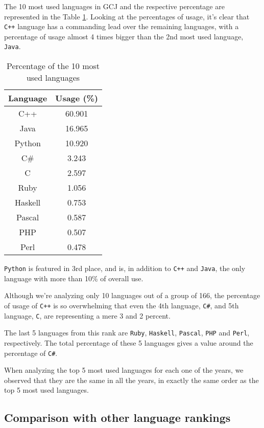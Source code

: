 \documentclass{article}
\begin{document}
\begin{multicols*}{2}
The 10 most used languages in GCJ and the respective percentage are represented in the Table \ref{lang_perc}.
Looking at the percentages of usage, it's clear that \texttt{C++} language has a commanding lead over the remaining languages, with a percentage of usage almost 4 times bigger than the 2nd most used language, \texttt{Java}.

\begin{table}[H]
\centering
\caption{Percentage of the 10 most used languages}
\label{lang_perc}
\begin{tabular}{c|c}
\textbf{Language} & \textbf{Usage (\%)} \\ \hline
C++               & 60.901       \\
Java              & 16.965       \\
Python            & 10.920       \\
C\#               & 3.243        \\
C                 & 2.597        \\
Ruby              & 1.056        \\
Haskell           & 0.753        \\
Pascal            & 0.587        \\
PHP               & 0.507        \\
Perl              & 0.478
\end{tabular}
\end{table}

\texttt{Python} is featured in 3rd place, and is, in addition to \texttt{C++} and \texttt{Java}, the only language with more than 10\% of overall use.

Although we're analyzing only 10 languages out of a group of 166, the percentage of usage of \texttt{C++} is so overwhelming that even the 4th language, \texttt{C\#}, and 5th language, \texttt{C}, are representing a mere 3 and 2 percent.

The last 5 languages from this rank are \texttt{Ruby}, \texttt{Haskell}, \texttt{Pascal}, \texttt{PHP} and \texttt{Perl}, respectively. The total percentage of these 5 languages gives a value around the percentage of \texttt{C\#}.


When analyzing the top 5 most used languages for each one of the years, we observed that they are the same in all the years, in exactly the same order as the top 5 most used languages.


\subsection{Comparison with other language rankings}


\end{multicols*}
\end{document}
